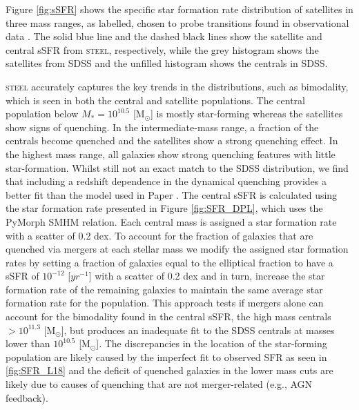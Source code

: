 Figure \ref{fig:sSFR} shows the specific star formation rate distribution of satellites in three mass ranges, as labelled, chosen to probe transitions found in observational data \citep{Bernardi2011EvidenceRelations, Bernardi2014SystematicMorphology, Cappellari2013TheFunction}. The solid blue line and the dashed black lines show the satellite and central sSFR from \textsc{steel}, respectively, while the grey histogram shows the satellites from SDSS and the unfilled histogram shows the centrals in SDSS. 

\textsc{steel} accurately captures the key trends in the distributions, such as bimodality, which is seen in both the central and satellite populations. The central population below $M_{*} = 10^{10.5}$ [M$_{\odot}$] is mostly star-forming whereas the satellites show signs of quenching. In the intermediate-mass range, a fraction of the centrals become quenched and the satellites show a strong quenching effect. In the highest mass range, all galaxies show strong quenching features with little star-formation. Whilst still not an exact match to the SDSS distribution, we find that including a redshift dependence in the dynamical quenching provides a better fit than the model used in Paper . The central sSFR is calculated using the star formation rate presented in Figure \ref{fig:SFR_DPL}, which uses the PyMorph SMHM relation. Each central mass is assigned a star formation rate with a scatter of 0.2 dex. To account for the fraction of galaxies that are quenched via mergers at each stellar mass we modify the assigned star formation rates by setting a fraction of galaxies equal to the elliptical fraction to have a sSFR of $10^{-12}$ [$yr^{-1}$] with a scatter of 0.2 dex and in turn, increase the star formation rate of the remaining galaxies to maintain the same average star formation rate for the population. This approach tests if mergers alone can account for the bimodality found in the central sSFR, the high mass centrals $ > 10^{11.3}$ [M$_{\odot}$], but produces an inadequate fit to the SDSS centrals at masses lower than $10^{10.5}$ [M$_{\odot}$]. The discrepancies in the location of the star-forming population are likely caused by the imperfect fit to observed SFR as seen in \ref{fig:SFR_L18} and the deficit of quenched galaxies in the lower mass cuts are likely due to causes of quenching that are not merger-related (e.g., AGN feedback).

